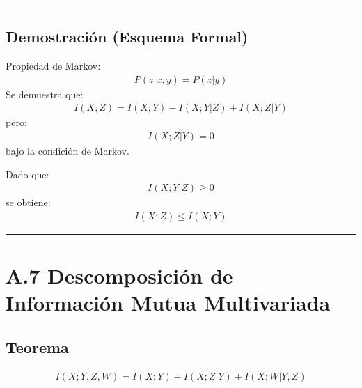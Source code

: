 \documentclass[letterpaper,10pt,english]{jupyterBook}
\begin{document}
\bigskip\hrule\bigskip



\subsection{Demostración (Esquema Formal)}
\label{\detokenize{05_appendices/proofs:demostracion-esquema-formal}}
\sphinxAtStartPar
Propiedad de Markov:
\begin{equation*}
\begin{split}
P(z|x,y)=P(z|y)
\end{split}
\end{equation*}
\sphinxAtStartPar
Se demuestra que:
\begin{equation*}
\begin{split}
I(X;Z)=I(X;Y)-I(X;Y|Z)+I(X;Z|Y)
\end{split}
\end{equation*}
\sphinxAtStartPar
pero:
\begin{equation*}
\begin{split}
I(X;Z|Y)=0
\end{split}
\end{equation*}
\sphinxAtStartPar
bajo la condición de Markov.

\sphinxAtStartPar
Dado que:
\begin{equation*}
\begin{split}
I(X;Y|Z)\ge0
\end{split}
\end{equation*}
\sphinxAtStartPar
se obtiene:
\begin{equation*}
\begin{split}
I(X;Z)\le I(X;Y)
\end{split}
\end{equation*}

\bigskip\hrule\bigskip



\section{A.7 Descomposición de Información Mutua Multivariada}
\label{\detokenize{05_appendices/proofs:a-7-descomposicion-de-informacion-mutua-multivariada}}

\subsection{Teorema}
\label{\detokenize{05_appendices/proofs:id10}}\begin{equation*}
\begin{split}
I(X;Y,Z,W)
=I(X;Y)+I(X;Z|Y)+I(X;W|Y,Z)
\end{split}
\end{equation*}
\end{document}
